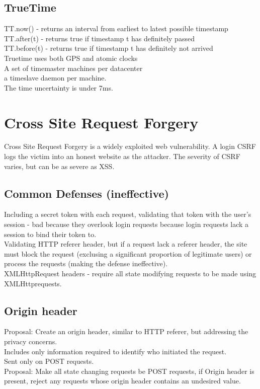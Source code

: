 \subsection{TrueTime}
TT.now() - returns an interval from earliest to latest possible timestamp\\
TT.after(t) - returns true if timestamp t has definitely passed\\
TT.before(t) - returns true if timestamp t has definitely not arrived\\
Truetime uses both GPS and atomic clocks\\
A set of timemaster machines per datacenter\\
a timeslave daemon per machine. \\
The time uncertainty is under 7ms.\\

\section{Cross Site Request Forgery}
Cross Site Request Forgery is a widely exploited web vulnerability. A login CSRF logs the victim into an honest website as the attacker. The severity of CSRF varies, but can be as severe as XSS.
\subsection{Common Defenses (ineffective)}
Including a secret token with each request, validating that token with the user's session - bad because they overlook login requests because login requests lack a session to bind their token to.\\
Validating HTTP referer header, but if a request lack a referer header, the site must block the request (exclusing a significant proportion of legitimate users) or process the requests (making the defense ineffective).\\
XMLHttpRequest headers - require all state modifying requests to be made using XMLHttprequests.
\subsection{Origin header}
Proposal: Create an origin header, similar to HTTP referer, but addressing the privacy concerns.\\
Includes only information required to identify who initiated the request.\\
Sent only on POST requests.\\
Proposal: Make all state changing requests be POST requests, if Origin header is present, reject any requests whose origin header contains an undesired value.
